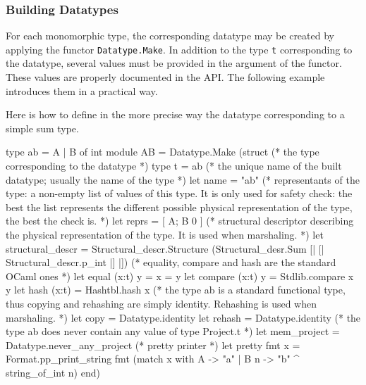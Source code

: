 \subsubsection{Building Datatypes}

For each monomorphic type, the corresponding datatype may be created by applying
the functor \texttt{Datatype.Make}. In addition to the
type \texttt{t} corresponding to the datatype, several values must be provided
in the argument of the functor. These values are properly documented in the
\framac API. The following example introduces them in a practical way.
\begin{example}
Here is how to define in the more precise way the datatype corresponding to a
simple sum type.
\begin{ocamlcode}
type ab = A | B of int
module AB =
  Datatype.Make
    (struct
       (* the type corresponding to the datatype *)
       type t = ab
       (* the unique name of the built datatype; usually the name of the
          type *)
       let name = "ab"
       (* representants of the type: a non-empty list of values of this type. It
          is only used for safety check: the best the list represents the
          different possible physical representation of the type, the best the
          check is. *)
       let reprs = [ A; B 0 ]
       (* structural descriptor describing the physical representation of the
          type. It is used when marshaling. *)
       let structural_descr =
         Structural_descr.Structure
           (Structural_desr.Sum [| [| Structural_descr.p_int |] |])
       (* equality, compare and hash are the standard OCaml ones *)
       let equal (x:t) y = x = y
       let compare (x:t) y = Stdlib.compare x y
       let hash (x:t) = Hashtbl.hash x
       (* the type ab is a standard functional type, thus copying and rehashing
          are simply identity. Rehashing is used when marshaling. *)
       let copy = Datatype.identity
       let rehash = Datatype.identity
       (* the type ab does never contain any value of type Project.t *)
       let mem_project = Datatype.never_any_project
       (* pretty printer *)
       let pretty fmt x =
         Format.pp_print_string fmt
          (match x with A -> "a" | B n -> "b" ^ string_of_int n)
     end)
\end{ocamlcode}
\end{example}
